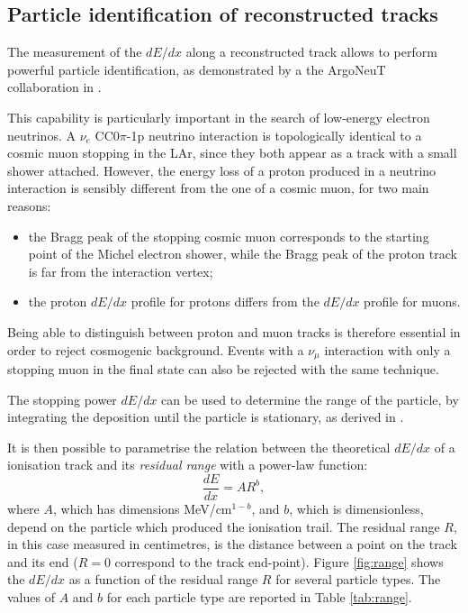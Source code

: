 \subsection{Particle identification of reconstructed tracks}\label{sec:proton_id}
The measurement of the $dE/dx$ along a reconstructed track allows to perform powerful particle identification, as demonstrated by a the ArgoNeuT collaboration in \cite{Acciarri:2013met}. 

This capability is particularly important in the search of low-energy electron neutrinos. A $\nu_e$ CC0$\pi$-1p neutrino interaction is topologically identical to a cosmic muon stopping in the LAr, since they both appear as a track with a small shower attached. However, the energy loss of a proton produced in a neutrino interaction is sensibly different from the one of a cosmic muon, for two main reasons:
\begin{itemize}
    \item the Bragg peak of the stopping cosmic muon corresponds to the starting point of the Michel electron shower, while the Bragg peak of the proton track is far from the interaction vertex;
    \item the proton $dE/dx$ profile for protons differs from the $dE/dx$ profile for muons.
\end{itemize}
Being able to distinguish between proton and muon tracks is therefore essential in order to reject cosmogenic background. Events with a $\nu_{\mu}$ interaction with only a stopping muon in the final state can also be rejected with the same technique.
\begin{mccorrection}
The stopping power $dE/dx$ can be used to determine the range of the particle, by integrating the deposition until the particle is stationary, as derived in \cite{Swift:2008kt}.
\end{mccorrection} It is then possible to parametrise the relation between the theoretical $dE/dx$ of a ionisation track and its \emph{residual range} with a power-law function:
\begin{equation}
    \frac{dE}{dx} = A R^b,
\end{equation}
where $A$, which has dimensions MeV/cm$^{1-b}$, and $b$, which is dimensionless, depend on the particle which produced the ionisation trail. The residual range $R$, in this case measured in centimetres, is the distance between a point on the track and its end ($R=0$ correspond to the track end-point).
Figure \ref{fig:range} shows the $dE/dx$ as a function of the residual range $R$ for several particle types. The values of $A$ and $b$ for each particle type are reported in Table \ref{tab:range}.


